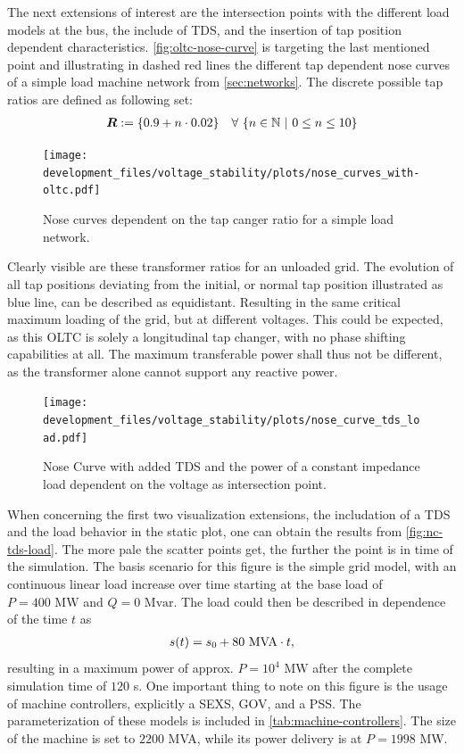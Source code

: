 The next extensions of interest are the intersection points with the different load models at the bus, the include of \acs{TDS}, and the insertion of tap position dependent characteristics.
\autoref{fig:oltc-nose-curve} is targeting the last mentioned point and illustrating in dashed red lines the different tap dependent nose curves of a simple load machine network from \autoref{sec:networks}.
The discrete possible tap ratios are defined as following set:
\begin{align}
    \boldsymbol{R} := \{0.9 + n \cdot 0.02\} \quad \forall~\{ n \in \mathbb{N}~\vert~0 \leq n \leq 10 \} \notag
\end{align}

\begin{figure}[htbp!]
    \centering
    \texttt{[image: development\_files/voltage\_stability/plots/nose\_curves\_with-oltc.pdf]}
    \caption[Nose curves dependent on the tap changer ratio for a simple load network]{Nose curves dependent on the tap canger ratio for a simple load network.}
    \label{fig:oltc-nose-curve}
\end{figure}

Clearly visible are these transformer ratios for an unloaded grid.
The evolution of all tap positions deviating from the initial, or normal tap position illustrated as blue line, can be described as equidistant.
Resulting in the same critical maximum loading of the grid, but at different voltages.
This could be expected, as this \acs{OLTC} is solely a longitudinal tap changer, with no phase shifting capabilities at all.
The maximum transferable power shall thus not be different, as the transformer alone cannot support any reactive power.

\begin{figure}[htbp!]
    \centering
    \texttt{[image: development\_files/voltage\_stability/plots/nose\_curve\_tds\_load.pdf]}
    \caption{Nose Curve with added \acs{TDS} and the power of a constant impedance load dependent on the voltage as intersection point.}
    \label{fig:nc-tds-load}
\end{figure}

When concerning the first two visualization extensions, the includation of a \acs{TDS} and the load behavior in the static plot, one can obtain the results from \autoref{fig:nc-tds-load}.
The more pale the scatter points get, the further the point is in time of the simulation.
The basis scenario for this figure is the simple grid model, with an continuous linear load increase over time starting at the base load of $P=400\text{ MW}$ and $Q=0\text{ Mvar}$.
The load could then be described in dependence of the time $t$ as 
\begin{align}
    s(t) = s_0 + 80\text{ MVA} \cdot t \notag,
\end{align}
resulting in a maximum power of approx. $P=10^4\text{ MW}$ after the complete simulation time of $120$ s.
One important thing to note on this figure is the usage of machine controllers, explicitly a \ac{SEXS}, \ac{GOV}, and a \ac{PSS}.
The parameterization of these models is included in \autoref{tab:machine-controllers}.
The size of the machine is set to $2200$ MVA, while its power delivery is at $P=1998$ MW.


